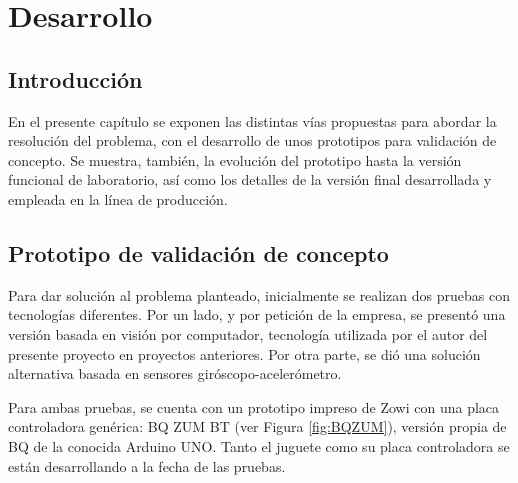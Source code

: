 
\chapter{Desarrollo} %

\label{Chapter3} %


\section{Introducción}

En el presente capítulo se exponen las distintas vías propuestas para abordar la resolución del problema, con el desarrollo de unos prototipos para validación de concepto. Se muestra, también, la evolución del prototipo hasta la versión funcional de laboratorio, así como los detalles de la versión final desarrollada y empleada en la línea de producción.


\section{Prototipo de validación de concepto}

Para dar solución al problema planteado, inicialmente se realizan dos pruebas con tecnologías diferentes. Por un lado, y por petición de la empresa, se presentó una versión basada en visión por computador, tecnología utilizada por el autor del presente proyecto en proyectos anteriores. Por otra parte, se dió una solución alternativa basada en sensores giróscopo-acelerómetro.

Para ambas pruebas, se cuenta con un prototipo impreso de Zowi con una placa controladora genérica: BQ ZUM BT (ver Figura \ref{fig:BQZUM}), versión propia de BQ de la conocida Arduino UNO. Tanto el juguete como su placa controladora se están desarrollando a la fecha de las pruebas.

